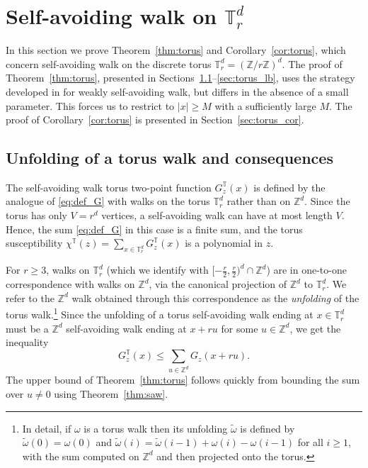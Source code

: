 \documentclass[11pt,hidelinks]{article}
\theoremstyle{plain}
\numberwithin{equation}{section}
\newcommand{\Z}{\mathbb{Z}}
\newcommand{\T}{\mathbb{T}}
\renewcommand{\(}{\left(}
\renewcommand{\)}{\right)}
\newcommand{\1}{\mathds{1}}
\providecommand{\abs}[1]{\lvert#1\rvert}
\newcommand{\supT}{^{ \mathbb{T} }}
\begin{document}
\section{Self-avoiding walk on $\T^d_r$}
\label{sec:torus}

In this section we prove Theorem~\ref{thm:torus} and Corollary~\ref{cor:torus}, which concern self-avoiding walk on the discrete torus $\T^d_r = (\Z / r\Z)^d$. 
The proof of Theorem~\ref{thm:torus}, presented in Sections~\ref{sec:torus_ub}--\ref{sec:torus_lb}, uses the strategy developed in \cite{Slad23_wsaw} for weakly self-avoiding walk, but differs in the absence of a small parameter. 
This forces us to restrict to $\abs x \ge M$ with a sufficiently large $M$. 
The proof of Corollary~\ref{cor:torus} is presented in Section~\ref{sec:torus_cor}. 


\subsection{Unfolding of a torus walk and consequences}
\label{sec:torus_ub}
The self-avoiding walk torus two-point function $G_z\supT(x)$ is defined by the analogue of \eqref{eq:def_G} with walks on the torus $\T^d_r$ rather than on $\Z^d$. 
Since the torus has only $V=r^d$ vertices, a self-avoiding walk can have at most length $V$. Hence, the sum \eqref{eq:def_G} in this case is a finite sum, and the torus susceptibility $\chi\supT(z) = \sum_{x\in \T^d_r} G_z\supT(x)$ is a polynomial in $z$. 

For $r\ge3$, walks on $\T^d_r$ 
(which we identify with $[ - \frac r 2, \frac r 2 )^d \cap \Z^d$) 
are in one-to-one correspondence with walks on $\Z^d$, via the canonical projection of $\Z^d$ to $\T^d_r$. We refer to the $\Z^d$ walk obtained through this correspondence as the \emph{unfolding} of the torus walk.\footnote{
In detail, if $\omega$ is a torus walk then its unfolding $\tilde \omega$ is defined by $\tilde \omega(0) = \omega(0)$ and $\tilde\omega(i) = \tilde \omega(i-1) + \omega(i) -  \omega(i-1) $ for all $i\ge 1$, with the sum computed on $\Z^d$ and then projected onto the torus.
}
Since the unfolding of a torus self-avoiding walk ending at $x\in \T^d_r$ must be a $\Z^d$ self-avoiding walk ending at $x+ru$ for some $u\in \Z^d$, we get the inequality
\begin{equation} \label{eq:unfold}
G_z\supT(x) \le \sum_{u \in \Z^d} G_z(x+ru). 
\end{equation}
The upper bound of Theorem~\ref{thm:torus} follows quickly from bounding the sum over $u\ne 0$ using Theorem~\ref{thm:saw}. 
\end{document}
